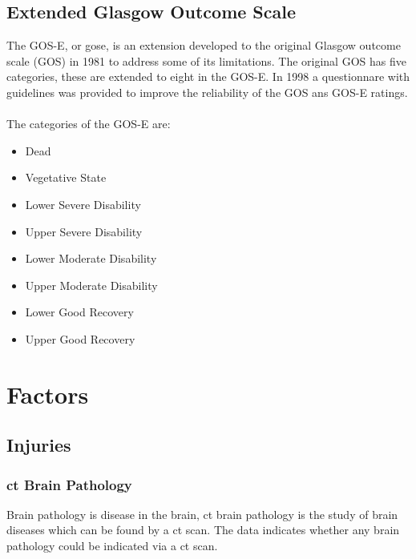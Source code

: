 \documentclass[11pt]{article}
\begin{document}
\subsection{Extended Glasgow Outcome Scale}
The GOS-E, or \gls{gose}, is an extension developed to the original Glasgow outcome scale (GOS) in 1981 to address some of its limitations. The original GOS has five categories, these are extended to eight in the GOS-E. In 1998 a questionnare with guidelines was provided to improve the reliability of the GOS ans GOS-E ratings\cite{GOSEExtendedGlasgow}.\cite{sanderExtendedGlasgowOutcome2002}\\
\\
The categories of the GOS-E are:
\begin{itemize}
  \item{Dead}
  \item{Vegetative State}
  \item{Lower Severe Disability}
  \item{Upper Severe Disability}
  \item{Lower Moderate Disability}
  \item{Upper Moderate Disability}
  \item{Lower Good Recovery}
  \item{Upper Good Recovery}
\end{itemize}



\section{Factors}

\subsection{Injuries}

\subsubsection{\gls{ct} Brain Pathology}
Brain pathology is disease in the brain, \gls{ct} brain pathology is the study of brain diseases which can be found by a \gls{ct} scan.
The data indicates whether any brain pathology could be indicated via a \gls{ct} scan.\cite{BrainPathologyDefinition}
\end{document}
